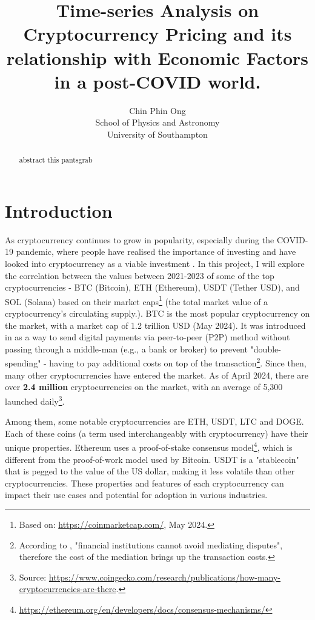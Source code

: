\documentclass[a4paper, 10pt, conference]{ieeeconf}      %
\title{\LARGE \bf
Time-series Analysis on Cryptocurrency Pricing and its relationship with Economic Factors in a post-COVID world.
}
\author{ \parbox{3 in}{\centering Chin Phin Ong\\
          School of Physics and Astronomy\\
          University of Southampton}}
\begin{document}
\maketitle
\thispagestyle{empty}
\pagestyle{empty}

\begin{abstract}

abstract this pantsgrab

\end{abstract}

\section{Introduction}
As cryptocurrency continues to grow in popularity, especially during the COVID-19 pandemic, where people have realised the importance of investing and have looked into cryptocurrency as a viable investment \cite{Corbet2018}. In this project, I will explore the correlation between the values between 2021-2023 of some of the top cryptocurrencies - BTC (Bitcoin), ETH (Ethereum), USDT (Tether USD), and SOL (Solana) based on their market caps\footnote{Based on: \url{https://coinmarketcap.com/}, May 2024.} (the total market value of a cryptocurrency's circulating supply.). BTC is the most popular cryptocurrency on the market, with a market cap of 1.2 trillion USD (May 2024). It was introduced in \cite{Nakamoto2008} as a way to send digital payments via peer-to-peer (P2P) method without passing through a middle-man (e.g., a bank or broker) to prevent "double-spending" - having to pay additional costs on top of the transaction\footnote{According to \cite{Nakamoto2008}, "financial institutions cannot avoid mediating disputes", therefore the cost of the mediation brings up the transaction costs.}. Since then, many other cryptocurrencies have entered the market. As of April 2024, there are over \textbf{2.4 million} cryptocurrencies on the market, with an average of 5,300 launched daily\footnote{Source: \url{https://www.coingecko.com/research/publications/how-many-cryptocurrencies-are-there}.}.

Among them, some notable cryptocurrencies are ETH, USDT, LTC and DOGE. Each of these coins (a term used interchangeably with cryptocurrency) have their unique properties. Ethereum uses a proof-of-stake consensus model\footnote{\url{https://ethereum.org/en/developers/docs/consensus-mechanisms/}}, which is different from the proof-of-work model used by Bitcoin. USDT is a "stablecoin" that is pegged to the value of the US dollar, making it less volatile than other cryptocurrencies. These properties and features of each cryptocurrency can impact their use cases and potential for adoption in various industries.
\end{document}
